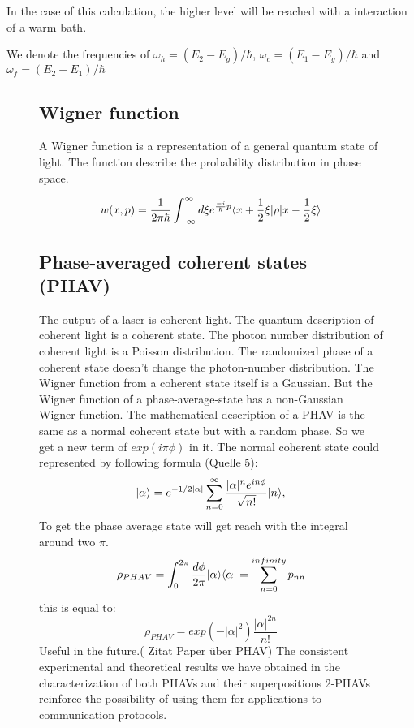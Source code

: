 \documentclass[12pt,a4paper]{article}
\DeclarePairedDelimiter\bra{\langle}{\rvert}
\DeclarePairedDelimiter\ket{\lvert}{\rangle}
\begin{document}
In the case of this calculation, the higher level will be reached with a interaction of a warm bath. 

We denote the frequencies of $\omega_h=(E_2-E_g)/\hbar$, $\omega_c=(E_1-E_g)/\hbar$ and $\omega_f=(E_2-E_1)/\hbar$
\begin{figure}[h!]
\centering


\subsection{Wigner function}
A Wigner function is a representation of a general quantum state of light.
The function describe the probability distribution in phase space.

\begin{equation}
w(x,p)=\frac{1}{2\pi \hbar}\int_{- \infty}^{\infty} d\xi e^{\frac{-i}{\hbar}p}\bra{x+\frac{1}{2}\xi}\rho\ket{x-\frac{1}{2}\xi}
\end{equation}

\newpage
\subsection{Phase-averaged coherent states (PHAV)}
The output of a laser is coherent light.
The quantum description of coherent light is a coherent state. The photon number distribution of coherent light is a Poisson distribution. The randomized phase of a coherent state doesn't change the photon-number distribution. 
The Wigner function from a coherent state itself is a Gaussian. But the Wigner function of a phase-average-state has a non-Gaussian Wigner function. 
The mathematical description of a  PHAV is the same as a normal coherent state but with a random phase. So we get a new term of $exp(i\pi\phi)$ in it. 
The normal coherent state could represented by following formula (Quelle 5):
\begin{equation}
\ket{\alpha}=e^{-1/2|\alpha|}\sum_{n=0}^{\infty}\frac{|\alpha|^n e^{in\phi}}{\sqrt{n!}} \ket{n},
\end{equation}
To get the phase average state will get reach with the integral around two $\pi$.
\begin{equation}
\rho_{PHAV}=\int_0 ^{2\pi}\frac{d\phi}{2\pi}\ket{\alpha}\bra{\alpha}=\sum_{n=0}^{infinity}p_{nn}
\end{equation}
this is equal to:
\begin{equation}
\rho_{PHAV}= exp(-|\alpha|^2)\frac{|\alpha|^{2n}}{n!}
\end{equation}
Useful in the future.( Zitat Paper über PHAV) The consistent experimental and theoretical results we have obtained in
the characterization of both PHAVs and their superpositions 2-PHAVs reinforce the
possibility of using them for applications to communication protocols.

\end{figure}
\end{document}
